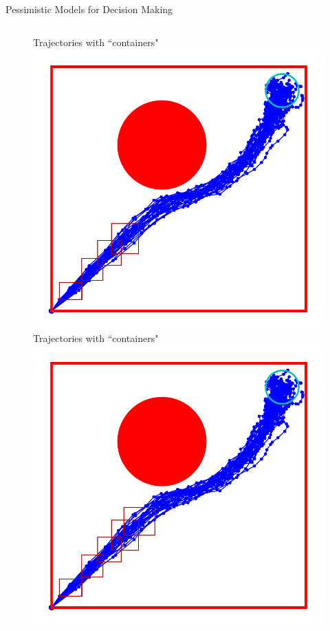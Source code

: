 \documentclass[lecture]{beamer}
\begin{document}
\begin{frame}{\normalsize Pessimistic Models for Decision Making}
\begin{columns}[t]
\begin{overlayarea}{\textwidth}{1\textheight}
\begin{figure}
{        }%
        {%
                \center
        Trajectories with ``containers"
   \includegraphics[width=\FS\textwidth]{Codes/BasicsSafety/PessimisticModel4.pdf}%
        }%
        {%
                \center
        Trajectories with ``containers"
  \includegraphics[width=\FS\textwidth]{Codes/BasicsSafety/PessimisticModel5.pdf}%
}
\end{figure}
\end{overlayarea}
\end{columns}
\end{frame}
\end{document}
